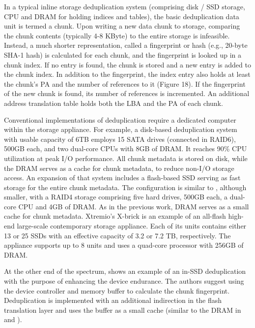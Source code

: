 \documentclass{superfri}
\begin{document}
In a typical inline storage deduplication system (comprising disk / SSD storage, CPU and DRAM for holding indices and tables), the basic deduplication data unit is termed a chunk. Upon writing a new data chunk to storage, comparing the chunk contents (typically 4-8 KByte) to the entire storage is infeasible. Instead, a much shorter representation, called a fingerprint or hash (e.g., 20-byte SHA-1 hash) is calculated for each chunk, and the fingerprint is looked up in a chunk index. If no entry is found, the chunk is stored and a new entry is added to the chunk index. In addition to the fingerprint, the index entry also holds at least the chunk's PA and the number of references to it (Figure 18). If the fingerprint of the new chunk is found, its number of references is incremented. An additional address translation table holds both the LBA and the PA of each chunk.

Conventional implementations of deduplication require a dedicated computer within the storage appliance. For example, a disk-based deduplication system \cite{zhu2008avoiding} with usable capacity of 6TB employs 15 SATA drives (connected in RAID6), 500GB each, and two dual-core CPUs with 8GB of DRAM. It reaches 90\% CPU utilization at peak I/O performance. All chunk metadata is stored on disk, while the DRAM serves as a cache for chunk metadata, to reduce non-I/O storage access. An expansion of that system \cite{debnath2010chunkstash} includes a flash-based SSD serving as fast storage for the entire chunk metadata. The configuration is similar to \cite{zhu2008avoiding}, although smaller, with a RAID4 storage comprising five hard drives, 500GB each, a dual-core CPU and 4GB of DRAM. As in the previous work, DRAM serves as a small cache for chunk metadata.  Xtremio's X-brick \cite{XbrickSpec} is an example of an all-flash high-end large-scale contemporary storage appliance. Each of its units contains either 13 or 25 SSDs with an effective capacity of 3.2 or 7.2 TB, respectively. The appliance supports up to 8 units and uses a quad-core processor with 256GB of DRAM. 

At the other end of the spectrum, \cite{chen2011caftl} shows an example of an in-SSD deduplication with the purpose of enhancing the device endurance. The authors suggest using the device controller and memory buffer to calculate the chunk fingerprint. Deduplication is implemented with an additional indirection in the flash translation layer and uses the buffer as a small cache (similar to the DRAM in \cite{debnath2010chunkstash} and \cite{zhu2008avoiding}). 
\end{document}
